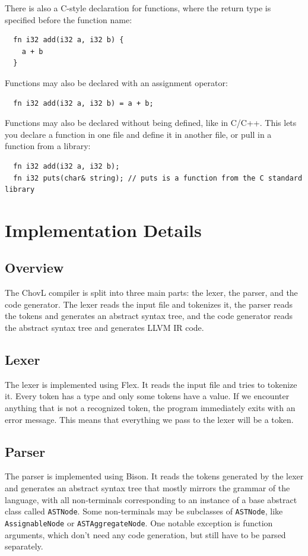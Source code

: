 There is also a C-style declaration for functions, where the return type is specified before the function name:
\begin{verbatim}
  fn i32 add(i32 a, i32 b) {
    a + b
  }
\end{verbatim}

Functions may also be declared with an assignment operator:
\begin{verbatim}
  fn i32 add(i32 a, i32 b) = a + b;
\end{verbatim}

Functions may also be declared without being defined, like in C/C++. This lets you declare a function in one file and define it in another file, or pull in a function from a library:
\begin{verbatim}
  fn i32 add(i32 a, i32 b);
  fn i32 puts(char& string); // puts is a function from the C standard library
\end{verbatim}

\section{Implementation Details}
\subsection{Overview}
The ChovL compiler is split into three main parts: the lexer, the parser, and the code generator. The lexer reads the input file and tokenizes it, the parser reads the tokens and generates an abstract syntax tree, and the code generator reads the abstract syntax tree and generates LLVM IR code.

\subsection{Lexer}
The lexer is implemented using Flex. It reads the input file and tries to tokenize it. Every token has a type and only some tokens have a value. If we encounter anything that is not a recognized token, the program immediately exits with an error message. This means that everything we pass to the lexer will be a token.

\subsection{Parser}

The parser is implemented using Bison. It reads the tokens generated by the lexer and generates an abstract syntax tree that mostly mirrors the grammar of the language, with all non-terminals corresponding to an instance of a base abstract class called \texttt{ASTNode}. Some non-terminals may be subclasses of \texttt{ASTNode}, like \texttt{AssignableNode} or \texttt{ASTAggregateNode}. One notable exception is function arguments, which don't need any code generation, but still have to be parsed separately.

